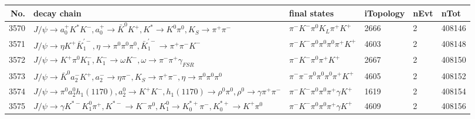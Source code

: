 \begin{table}[htbp] 
\begin{center}
\begin{small}
\begin{tabular}{rlllll}\hline\hline
 No. & decay chain & final states &  iTopology & nEvt & nTot \\\hline
3570&$J/\psi       \rightarrow a_{0}^{+}      K^{*}          K^{-}          , a_{0}^{+}       \rightarrow \bar{K}^{0}   K^{+}          , K^{*}           \rightarrow K^{0}          \pi^{0}        , K_{S}           \rightarrow \pi^{+}        \pi^{-}        $&$\pi^{-}        K^{-}          \pi^{0}        K_{L}          \pi^{+}        K^{+}          $& 2666&    2&408146\\
3571&$J/\psi       \rightarrow \eta          K^{+}          \bar{K}_1^{'-}, \eta           \rightarrow \pi^{0}        \pi^{0}        \pi^{0}        , \bar{K}_1^{'-} \rightarrow \pi^{+}        \pi^{-}        K^{-}          $&$\pi^{-}        K^{-}          \pi^{0}        \pi^{0}        \pi^{0}        \pi^{+}        K^{+}          $& 4603&    2&408148\\
3572&$J/\psi       \rightarrow K^{+}          \pi^{0}        K_{1}^{-}      , K_{1}^{-}       \rightarrow \omega         K^{-}          , \omega          \rightarrow \pi^{-}        \pi^{+}        \gamma_{FSR} $&$\pi^{-}        K^{-}          \pi^{0}        \pi^{+}        K^{+}          $& 2667&    2&408150\\
3573&$J/\psi       \rightarrow \bar{K}^{0}   a_{2}^{-}      K^{+}          , a_{2}^{-}       \rightarrow \eta          \pi^{-}        , K_{S}           \rightarrow \pi^{+}        \pi^{-}        , \eta           \rightarrow \pi^{0}        \pi^{0}        \pi^{0}        $&$\pi^{-}        \pi^{-}        \pi^{0}        \pi^{0}        \pi^{0}        \pi^{+}        K^{+}          $& 4605&    2&408152\\
3574&$J/\psi       \rightarrow \pi^{0}        a_{2}^{0}      h_{1}(1170)    , a_{2}^{0}       \rightarrow K^{+}          K^{-}          , h_{1}(1170)     \rightarrow \rho^{0}      \pi^{0}        , \rho^{0}       \rightarrow \gamma       \pi^{+}        \pi^{-}        $&$\pi^{-}        K^{-}          \pi^{0}        \pi^{0}        \pi^{+}        \gamma       K^{+}          $& 1619&    2&408154\\
3575&$J/\psi       \rightarrow \gamma       K^{*-}         K_1^{0}        \pi^{+}        , K^{*-}          \rightarrow K^{-}          \pi^{0}        , K_1^{0}         \rightarrow K_{0}^{*+}     \pi^{-}        , K_{0}^{*+}      \rightarrow K^{+}          \pi^{0}        $&$\pi^{-}        K^{-}          \pi^{0}        \pi^{0}        \pi^{+}        \gamma       K^{+}          $& 4609&    2&408156\\

\end{tabular}
\end{small}
\end{center}
\end{table}
